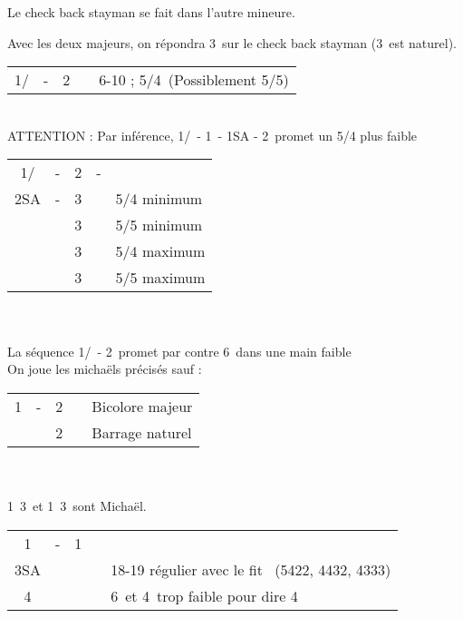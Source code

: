 \documentclass[a4paper, oneside, 11pt]{report}
\begin{document}
		Le check back stayman se fait dans l'autre mineure.

		Avec les deux majeurs, on répondra 3\coeur\ sur le check back stayman (3\carreau\ est naturel).\\

		\begin{tabular}{cccc|l}
		1\trefle/\carreau & - & 2\coeur && 6-10 ; 5\pique/4\coeur\ (Possiblement 5/5)\\
		\end{tabular}\\
		ATTENTION : Par inférence, 1\trefle/\carreau\ - 1\pique\ - 1SA - 2\coeur\ promet un 5/4 plus faible\\
	
		\begin{tabular}{cccc|l}
		1\trefle/\carreau & - & 2\coeur & - &\\
		2SA & - & 3\trefle && 5/4 minimum\\
		&& 3\carreau && 5/5 minimum\\
		&& 3\coeur && 5/4 maximum\\
		&& 3\pique && 5/5 maximum\\
		\end{tabular}\\\\
	
		La séquence 1\trefle/\carreau\ - 2\pique\ promet par contre 6\pique\ dans une main faible\\
		
		\SSection{1\trefle\ 2\trefle\ \& 1\trefle\ 2\carreau}
		On joue les michaëls précisés sauf :\\
		
		\begin{tabular}{cccc|l}
		1\trefle & - & 2\trefle && Bicolore majeur\\
		&& 2\carreau && Barrage naturel\\
		\end{tabular}\\\\

		1\trefle\ 3\trefle\ et 1\carreau\ 3\trefle\ sont Michaël.\\

		\begin{tabular}{cccc|l}
		1\trefle & - & 1\coeur &&\\
		3SA &&&& 18-19 régulier avec le fit \coeur\ (5422, 4432, 4333)\\
		4\coeur &&&& 6\trefle\ et 4\coeur\ trop faible pour dire 4\trefle\\
		\end{tabular}\\\\
\end{document}
